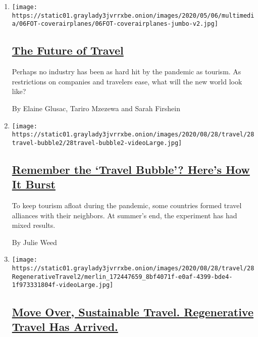 \begin{enumerate}
\def\labelenumi{\arabic{enumi}.}
\item
  \texttt{[image: https://static01.graylady3jvrrxbe.onion/images/2020/05/06/multimedia/06FOT-coverairplanes/06FOT-coverairplanes-jumbo-v2.jpg]}

  \hypertarget{the-future-of-travel}{%
  \subsection{\texorpdfstring{\href{/interactive/2020/05/06/travel/coronavirus-travel-questions.html}{The
  Future of Travel}}{The Future of Travel}}\label{the-future-of-travel}}

  Perhaps no industry has been as hard hit by the pandemic as tourism.
  As restrictions on companies and travelers ease, what will the new
  world look like?

  By Elaine Glusac, Tariro Mzezewa and Sarah Firshein
\item
  \texttt{[image: https://static01.graylady3jvrrxbe.onion/images/2020/08/28/travel/28travel-bubble2/28travel-bubble2-videoLarge.jpg]}

  \hypertarget{remember-the-travel-bubble-heres-how-it-burst}{%
  \subsection{\texorpdfstring{\href{/2020/08/28/travel/international-travel-bubbles-coronavirus.html}{Remember
  the `Travel Bubble'? Here's How It
  Burst}}{Remember the `Travel Bubble'? Here's How It Burst}}\label{remember-the-travel-bubble-heres-how-it-burst}}

  To keep tourism afloat during the pandemic, some countries formed
  travel alliances with their neighbors. At summer's end, the experiment
  has had mixed results.

  By Julie Weed
\item
  \texttt{[image: https://static01.graylady3jvrrxbe.onion/images/2020/08/28/travel/28RegenerativeTravel2/merlin\_172447659\_8bf4071f-e0af-4399-bde4-1f973331804f-videoLarge.jpg]}

  \hypertarget{move-over-sustainable-travel-regenerative-travel-has-arrived}{%
  \subsection{\texorpdfstring{\href{/2020/08/27/travel/travel-future-coronavirus-sustainable.html}{Move
  Over, Sustainable Travel. Regenerative Travel Has
  Arrived.}}{Move Over, Sustainable Travel. Regenerative Travel Has Arrived.}}\label{move-over-sustainable-travel-regenerative-travel-has-arrived}}


\end{enumerate}

